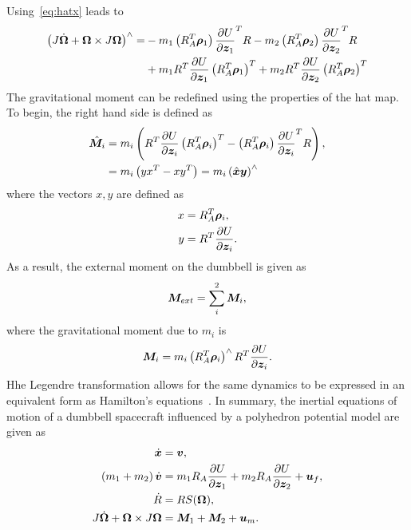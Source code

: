 Using~\cref{eq:hatx} leads to
\begin{align}
    \left( J \dot{\bm{\Omega}} + \bm{\Omega} \times J \bm{\Omega} \right)^\wedge =& - m_1 \left( R_A^T \bm{\rho}_1 \right) \frac{\partial U}{\partial \bm{z}_1}^T R  - m_2 \left( R_A^T \bm{\rho}_2 \right) \frac{\partial U}{\partial \bm{z}_2}^T R \nonumber \\
    &+ m_1 R^T \frac{\partial U}{\partial \bm{z}_1} \left( R_A^T \bm{\rho}_1 \right)^T + m_2 R^T \frac{\partial U}{\partial \bm{z}_2} \left( R_A^T \bm{\rho}_2 \right)^T
\end{align}
The gravitational moment can be redefined using the properties of the hat map.
To begin, the right hand side is defined as
\begin{align}
    \hat{\bm{M}}_i &= m_i \left( R^T \frac{\partial U}{\partial \bm{z}_i} \left( R_A^T \bm{\rho}_i \right)^T - \left( R_A^T \bm{\rho}_i \right) \frac{\partial U}{\partial \bm{z}_i}^T R \right) ,\\
             &= m_i \left(  y x^T - x y^T \right) = m_i \left( \hat{\bm{x}}\bm{y} \right)^\wedge
\end{align}
where the vectors \( x, y\) are defined as
\begin{align*}
    x &= R_A^T \bm{\rho}_i , \\
    y &= R^T \frac{\partial U}{\partial \bm{z}_i} .
\end{align*}
As a result, the external moment on the dumbbell is given as
\begin{align}
    \bm{M}_{ext} = \sum_{i}^2 \bm{M}_i , 
\end{align}
where the gravitational moment  due to \( m_i \) is
\begin{align}
    \bm{M}_i = m_i \left( R_A^T \bm{\rho}_i \right)^\wedge R^T \frac{\partial U}{\partial \bm{z}_i}.
\end{align}
Hhe Legendre transformation allows for the same dynamics to be expressed in an equivalent form as Hamilton's equations~\cite{lanczos1970}.
In summary, the inertial equations of motion of a dumbbell spacecraft influenced by a polyhedron potential model are given as
\begin{align}
    \dot{\bm{x}} &= \bm{v}, \label{eq:position_kinematics}\\
    \left( m_1 + m_2 \right) \dot{\bm{v}} &= m_1 R_A \frac{\partial U}{\partial \bm{z}_1} + m_2 R_A \frac{\partial U}{\partial \bm{z}_2} + \bm{u}_f, \label{eq:translational_dynamics}\\
    \dot{R} &= R S(\bm{\Omega}) , \label{eq:attitude_kinematics}\\
    J \dot{\bm{\Omega}} + \bm{\Omega} \times J \bm{\Omega} &= \bm{M}_1 + \bm{M}_2 + \bm{u}_m. \label{eq:attitude_dynamics}
\end{align}

